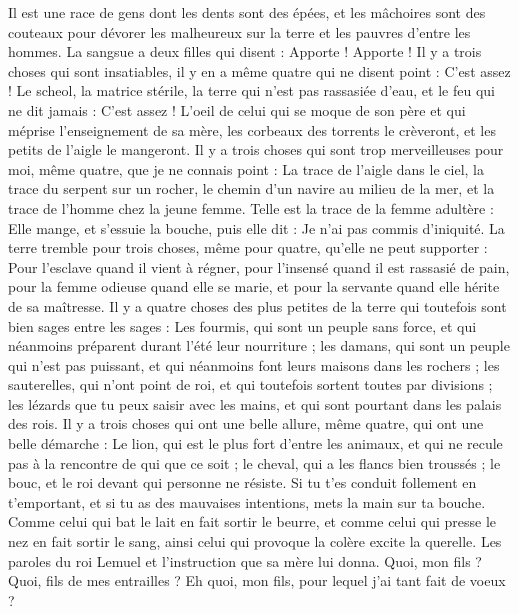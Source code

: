 \begin{multicols}{2}
Il est une race de gens dont les dents sont des épées, et les mâchoires sont des couteaux pour dévorer les malheureux sur la terre et les pauvres d'entre les hommes.
La sangsue a deux filles qui disent : Apporte ! Apporte ! Il y a trois choses qui sont insatiables, il y en a même quatre qui ne disent point : C'est assez !
Le scheol, la matrice stérile, la terre qui n'est pas rassasiée d'eau, et le feu qui ne dit jamais : C'est assez !
L'oeil de celui qui se moque de son père et qui méprise l'enseignement de sa mère, les corbeaux des torrents le crèveront, et les petits de l'aigle le mangeront.
Il y a trois choses qui sont trop merveilleuses pour moi, même quatre, que je ne connais point :
La trace de l'aigle dans le ciel, la trace du serpent sur un rocher, le chemin d'un navire au milieu de la mer, et la trace de l'homme chez la jeune femme.
Telle est la trace de la femme adultère : Elle mange, et s'essuie la bouche, puis elle dit : Je n'ai pas commis d'iniquité.
La terre tremble pour trois choses, même pour quatre, qu'elle ne peut supporter :
Pour l'esclave quand il vient à régner, pour l'insensé quand il est rassasié de pain,
pour la femme odieuse quand elle se marie, et pour la servante quand elle hérite de sa maîtresse.
Il y a quatre choses des plus petites de la terre qui toutefois sont bien sages entre les sages :
Les fourmis, qui sont un peuple sans force, et qui néanmoins préparent durant l'été leur nourriture ;
les damans, qui sont un peuple qui n'est pas puissant, et qui néanmoins font leurs maisons dans les rochers ;
les sauterelles, qui n'ont point de roi, et qui toutefois sortent toutes par divisions ;
les lézards que tu peux saisir avec les mains, et qui sont pourtant dans les palais des rois.
Il y a trois choses qui ont une belle allure, même quatre, qui ont une belle démarche :
Le lion, qui est le plus fort d'entre les animaux, et qui ne recule pas à la rencontre de qui que ce soit ;
le cheval, qui a les flancs bien troussés ; le bouc, et le roi devant qui personne ne résiste.
Si tu t'es conduit follement en t'emportant, et si tu as des mauvaises intentions, mets la main sur ta bouche.
Comme celui qui bat le lait en fait sortir le beurre, et comme celui qui presse le nez en fait sortir le sang, ainsi celui qui provoque la colère excite la querelle.
\VerseOne{}Les paroles du roi Lemuel et l'instruction que sa mère lui donna.
Quoi, mon fils ? Quoi, fils de mes entrailles ? Eh quoi, mon fils, pour lequel j'ai tant fait de voeux ?

\end{multicols}
